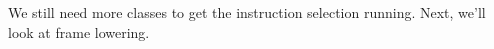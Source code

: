 We still need more classes to get the instruction selection running. Next, we’ll look at frame lowering.

































































